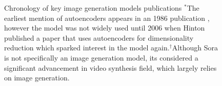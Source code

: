 \begin{figure}
    \centering
    \caption{Chronology of key image generation models publications $^*$The earliest mention of autoencoders appears in an 1986 publication \cite{autoencoder_original_paper_1986}, however the model was not widely used until 2006 when Hinton published a paper that uses autoencoders for dimensionality reduction \cite{autoencoder_2006_paper} which sparked interest in the model again.$^\dag$Although Sora \cite{sora_website} is not specifically an image generation model, its considered a significant advancement in video synthesis field, which largely relies on image generation.}
    \label{fig:timeline}
  \end{figure}